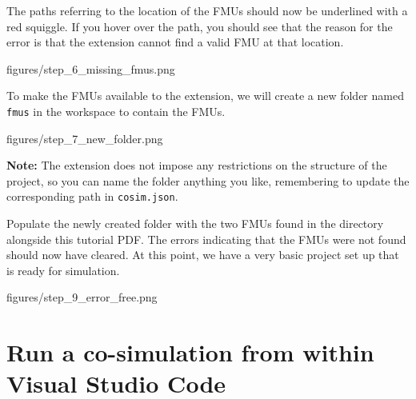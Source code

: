 \documentclass[11pt,a4paper]{../tutorial}
\begin{document}
\begin{instructions}
\item The paths referring to the location of the FMUs should now be underlined with a red squiggle. If you hover over the path, you should see that the reason for the error is that the extension cannot find a valid FMU at that location.
	
	\begin{annotation}[width=0.9\linewidth]{figures/step_6_missing_fmus.png}
	\end{annotation}

\item To make the FMUs available to the extension, we will create a new folder named \texttt{fmus} in the workspace to contain the FMUs.
	
	\begin{annotation}[width=0.9\linewidth]{figures/step_7_new_folder.png}
	\end{annotation}

	\bigskip
    \bigskip
    {\large\bfseries Note:} The extension does not impose any restrictions on the structure of the project, so you can name the folder anything you like, remembering to update the corresponding path in \texttt{cosim.json}.

\item Populate the newly created folder with the two FMUs found in the directory alongside this tutorial PDF. The errors indicating that the FMUs were not found should now have cleared. At this point, we have a very basic project set up that is ready for simulation.
	
	\begin{annotation}[width=0.9\linewidth]{figures/step_9_error_free.png}
	\end{annotation}

\end{instructions}

\newpage 

\section{Run a co-simulation from within Visual Studio Code}
\end{document}
